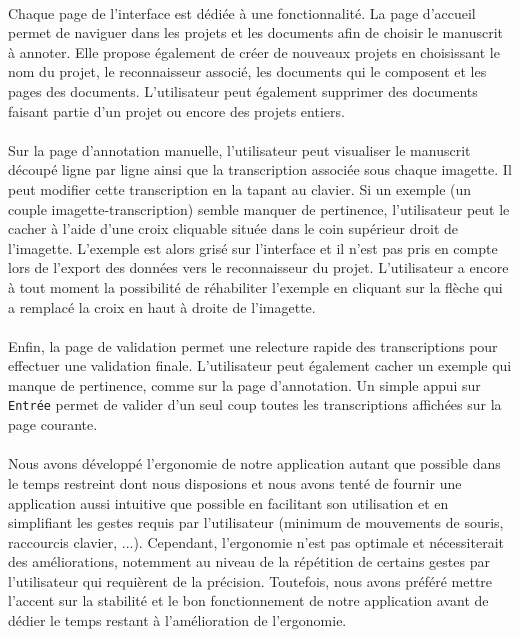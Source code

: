\paragraph{}
Chaque page de l'interface est dédiée à une fonctionnalité. La page d'accueil permet de naviguer dans les projets et les documents afin de choisir le manuscrit à annoter. Elle propose également de créer de nouveaux projets en choisissant le nom du projet, le reconnaisseur associé, les documents qui le composent et les pages des documents. L'utilisateur peut également supprimer des documents faisant partie d'un projet ou encore des projets entiers.

\paragraph{}
Sur la page d'annotation manuelle, l'utilisateur peut visualiser le manuscrit découpé ligne par ligne ainsi que la transcription associée sous chaque imagette. Il peut modifier cette transcription en la tapant au clavier. Si un exemple (un couple imagette-transcription) semble manquer de pertinence, l'utilisateur peut le cacher à l'aide d'une croix cliquable située dans le coin supérieur droit de l'imagette. L'exemple est alors grisé sur l'interface et il n'est pas pris en compte lors de l'export des données vers le reconnaisseur du projet. L'utilisateur a encore à tout moment la possibilité de réhabiliter l'exemple en cliquant sur la flèche qui a remplacé la croix en haut à droite de l'imagette.

\paragraph{}
Enfin, la page de validation permet une relecture rapide des transcriptions pour effectuer une validation finale. L'utilisateur peut également cacher un exemple qui manque de pertinence, comme sur la page d'annotation. Un simple appui sur \texttt{Entrée} permet de valider d'un seul coup toutes les transcriptions affichées sur la page courante.

\paragraph{}
Nous avons développé l'ergonomie de notre application autant que possible dans le temps restreint dont nous disposions et nous avons tenté de fournir une application aussi intuitive que possible en facilitant son utilisation et en simplifiant les gestes requis par l'utilisateur (minimum de mouvements de souris, raccourcis clavier, ...). Cependant, l'ergonomie n'est pas optimale et nécessiterait des améliorations, notemment au niveau de la répétition de certains gestes par l'utilisateur qui requièrent de la précision. Toutefois, nous avons préféré mettre l'accent sur la stabilité et le bon fonctionnement de notre application avant de dédier le temps restant à l'amélioration de l'ergonomie.
